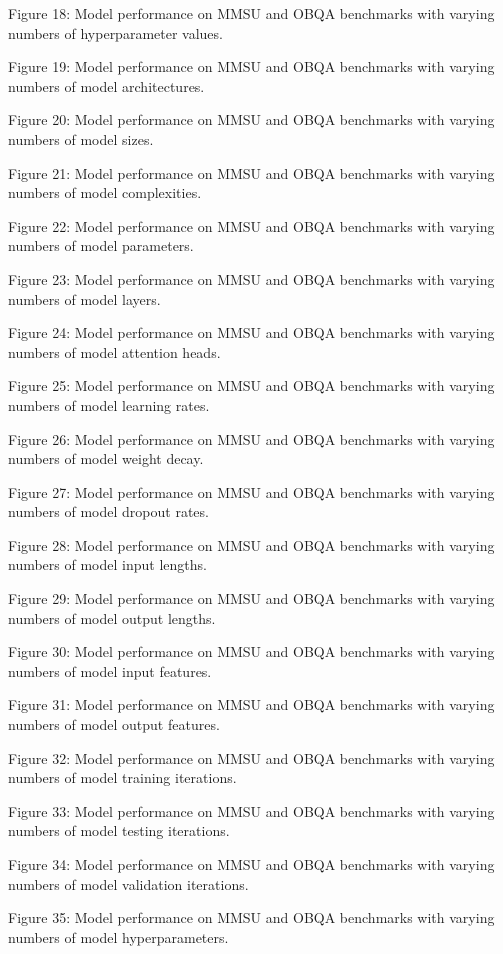         Figure 18: Model performance on MMSU and OBQA benchmarks with varying numbers of hyperparameter values.

        Figure 19: Model performance on MMSU and OBQA benchmarks with varying numbers of model architectures.

        Figure 20: Model performance on MMSU and OBQA benchmarks with varying numbers of model sizes.

        Figure 21: Model performance on MMSU and OBQA benchmarks with varying numbers of model complexities.

        Figure 22: Model performance on MMSU and OBQA benchmarks with varying numbers of model parameters.

        Figure 23: Model performance on MMSU and OBQA benchmarks with varying numbers of model layers.

        Figure 24: Model performance on MMSU and OBQA benchmarks with varying numbers of model attention heads.

        Figure 25: Model performance on MMSU and OBQA benchmarks with varying numbers of model learning rates.

        Figure 26: Model performance on MMSU and OBQA benchmarks with varying numbers of model weight decay.

        Figure 27: Model performance on MMSU and OBQA benchmarks with varying numbers of model dropout rates.

        Figure 28: Model performance on MMSU and OBQA benchmarks with varying numbers of model input lengths.

        Figure 29: Model performance on MMSU and OBQA benchmarks with varying numbers of model output lengths.

        Figure 30: Model performance on MMSU and OBQA benchmarks with varying numbers of model input features.

        Figure 31: Model performance on MMSU and OBQA benchmarks with varying numbers of model output features.

        Figure 32: Model performance on MMSU and OBQA benchmarks with varying numbers of model training iterations.

        Figure 33: Model performance on MMSU and OBQA benchmarks with varying numbers of model testing iterations.

        Figure 34: Model performance on MMSU and OBQA benchmarks with varying numbers of model validation iterations.

        Figure 35: Model performance on MMSU and OBQA benchmarks with varying numbers of model hyperparameters.

